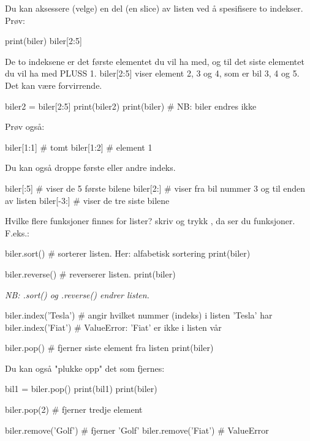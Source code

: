 Du kan aksessere (velge) en del (en slice) av listen ved å spesifisere to indekser. Prøv: 

\begin{usncodebox}
print(biler)
biler[2:5]
\end{usncodebox}

De to indeksene er det første elementet du vil ha med, og til det siste elementet du vil ha med PLUSS 1. biler[2:5] viser element 2, 3 og 4, som er bil 3, 4 og 5. Det kan være forvirrende. 

\begin{usncodebox}
biler2 = biler[2:5] 
print(biler2)
print(biler)          # NB: biler endres ikke 
\end{usncodebox}

Prøv også:

\begin{usncodebox}
biler[1:1]   # tomt
biler[1:2]   # element 1
\end{usncodebox}

Du kan også droppe første eller andre indeks.

\begin{usncodebox}
biler[:5]     # viser de 5 første bilene
biler[2:]     # viser fra bil nummer 3 og til enden av listen
biler[-3:]    # viser de tre siste bilene
\end{usncodebox}

Hvilke flere funksjoner finnes for lister? skriv  og trykk , da ser du funksjoner. F.eks.:

\begin{usncodebox}
biler.sort()          # sorterer listen. Her: alfabetisk sortering
print(biler)

biler.reverse()       # reverserer listen. 
print(biler)
\end{usncodebox}

\emph{NB: .sort() og .reverse() endrer listen.}

\begin{usncodebox}
biler.index('Tesla')  # angir hvilket nummer (indeks) i listen 'Tesla' har 
biler.index('Fiat')   # ValueError: 'Fiat' er ikke i listen vår 

biler.pop()           # fjerner siste element fra listen
print(biler)
\end{usncodebox}

Du kan også "plukke opp" det som fjernes:
\begin{usncodebox}
bil1 = biler.pop()
print(bil1)
print(biler)

biler.pop(2)          # fjerner tredje element 

biler.remove('Golf')  # fjerner 'Golf'
biler.remove('Fiat')  # ValueError
\end{usncodebox}

